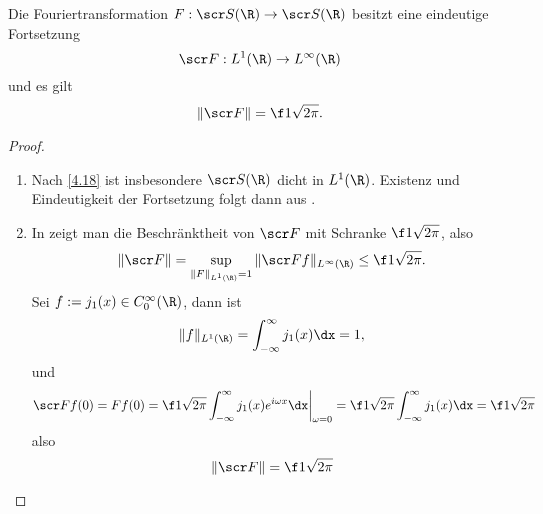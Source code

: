 \begin{st} \label{4.24}
	Die Fouriertransformation $F: \scr S(\R) \to \scr S(\R)$ besitzt eine eindeutige Fortsetzung
	\[
		\scr F: L^1(\R) \to L^\infty(\R)
	\]
	und es gilt
	\[
		\|\scr F\| = \f 1{\sqrt{2\pi}}.
	\]
	\begin{proof}
		\begin{enumerate}[1)]
			\item
				Nach \ref{4.18} ist insbesondere $\scr S(\R)$ dicht in $L^1(\R)$.
				Existenz und Eindeutigkeit der Fortsetzung folgt dann aus .
			\item
				In  zeigt man die Beschränktheit von $\scr F$ mit Schranke $\f 1{\sqrt{2\pi}}$, also
				\[
					\| \scr F\| = \sup_{\|F\|_{L^1(\R)}=1} \|\scr F f\|_{L^\infty(\R)} \le \f 1{\sqrt{2\pi}}.
				\]
				Sei $f := j_1(x) \in C_0^\infty(\R)$, dann ist
				\[
					\|f\|_{L^1(\R)} = \int_{-\infty}^\infty j_1(x) \dx = 1,
				\]
				und
				\[
					\scr F f(0)
					= F f(0)
					= \f 1{\sqrt{2\pi}} \int_{-\infty}^\infty j_1(x) e^{i\omega x} \dx \bigg|_{\omega = 0}
					= \f 1{\sqrt{2\pi}} \int_{-\infty}^\infty j_1(x) \dx
					= \f 1{\sqrt{2\pi}}
				\]
				also
				\[
					\| \scr F\| = \f 1{\sqrt{2\pi}}
				\]
		\end{enumerate}
	\end{proof}
\end{st}

